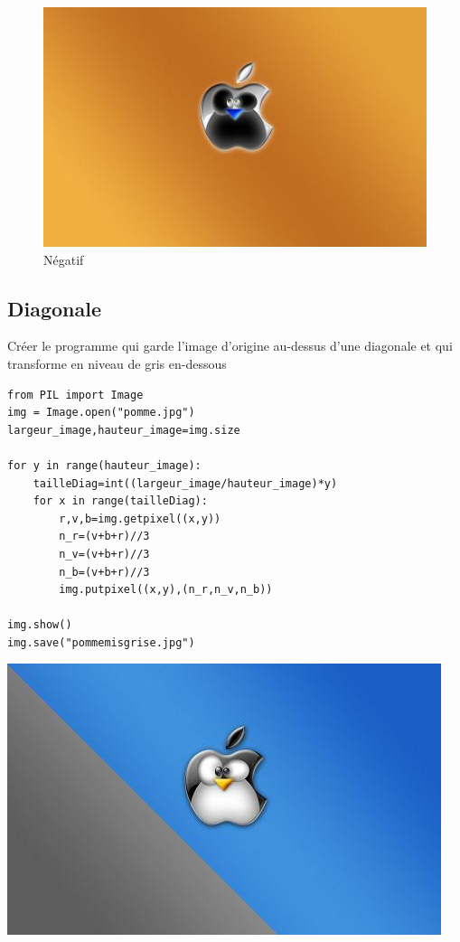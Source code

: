 \documentclass[11pt]{article}
\begin{document}
\begin{figure}[htbp]
\centering
\includegraphics[width=.9\linewidth]{pommeNegatif.jpg}
\caption{Négatif}
\end{figure}

\subsection{Diagonale}
\label{sec:org51b03b7}

Créer le programme qui garde l'image d'origine au-dessus d'une diagonale et qui transforme en niveau de gris en-dessous

\begin{verbatim}
from PIL import Image
img = Image.open("pomme.jpg")
largeur_image,hauteur_image=img.size

for y in range(hauteur_image):
    tailleDiag=int((largeur_image/hauteur_image)*y)
    for x in range(tailleDiag):
        r,v,b=img.getpixel((x,y))
        n_r=(v+b+r)//3
        n_v=(v+b+r)//3
        n_b=(v+b+r)//3
        img.putpixel((x,y),(n_r,n_v,n_b))

img.show()
img.save("pommemisgrise.jpg")
\end{verbatim}

\begin{center}
\includegraphics[width=.9\linewidth]{pommemisgrise.jpg}
\end{center}
\end{document}
